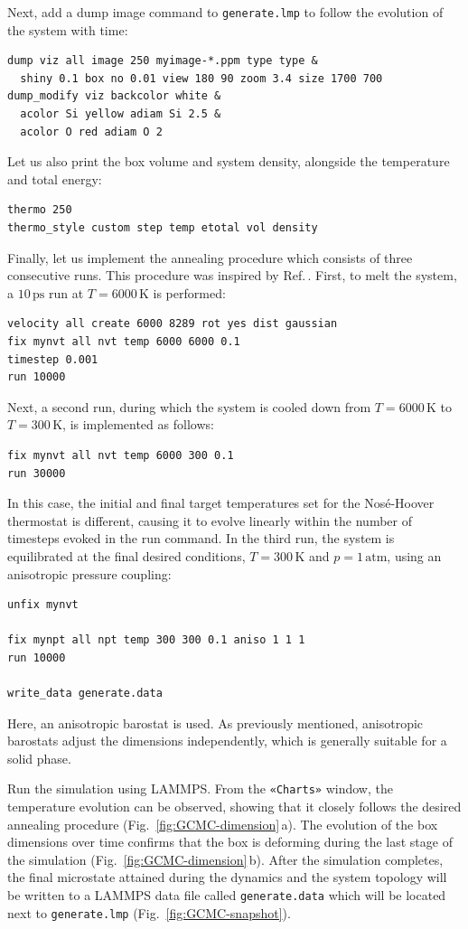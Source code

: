 \documentclass[9pt,tutorial]{livecoms}
\newcommand{\lmpcmd}[1]{\colorbox{listing}{\textcolor{command}{\small{#1}}}} %
\newcommand{\flecmd}[1]{\textcolor{command}{\texttt{#1}}} %
\newcommand{\guicmd}[1]{\textcolor{command}{\texttt{«#1»}}} %
\begin{document}
Next, add a \lmpcmd{dump image} command to \flecmd{generate.lmp} to follow the
evolution of the system with time:
\begin{lstlisting}
dump viz all image 250 myimage-*.ppm type type &
  shiny 0.1 box no 0.01 view 180 90 zoom 3.4 size 1700 700
dump_modify viz backcolor white &
  acolor Si yellow adiam Si 2.5 &
  acolor O red adiam O 2
\end{lstlisting}
Let us also print the box volume and system density, alongside the
temperature and total energy:
\begin{lstlisting}
thermo 250
thermo_style custom step temp etotal vol density
\end{lstlisting}

Finally, let us implement the annealing procedure which
consists of three consecutive runs.  This procedure was inspired
by Ref.\,\cite{della1992molecular}.  First, to melt the system,
a $10\,\text{ps}$ run at $T = 6000\,\text{K}$ is performed:
\begin{lstlisting}
velocity all create 6000 8289 rot yes dist gaussian
fix mynvt all nvt temp 6000 6000 0.1
timestep 0.001
run 10000
\end{lstlisting}
Next, a second run, during which the system is cooled down from $T = 6000\,\text{K}$
to $T = 300\,\text{K}$, is implemented as follows:
\begin{lstlisting}
fix mynvt all nvt temp 6000 300 0.1
run 30000
\end{lstlisting}
In this case, the initial and final target temperatures
set for the Nos\'e-Hoover thermostat is different, causing it to evolve
linearly within the number of timesteps evoked in the \lmpcmd{run} command.
In the third run, the system is equilibrated at the final desired
conditions, $T = 300\,\text{K}$ and $p = 1\,\text{atm}$,
using an anisotropic pressure coupling:
\begin{lstlisting}
unfix mynvt

fix mynpt all npt temp 300 300 0.1 aniso 1 1 1
run 10000

write_data generate.data
\end{lstlisting}
Here, an anisotropic barostat is used.
As previously mentioned, anisotropic
barostats adjust the dimensions independently, which is
generally suitable for a solid phase.

Run the simulation using LAMMPS.  From the \guicmd{Charts} window, the temperature
evolution can be observed, showing that it closely follows the desired annealing procedure (Fig.~\ref{fig:GCMC-dimension}\,a).
The evolution of the box dimensions over time confirms that the box
is deforming during the last stage of the simulation
(Fig.~\ref{fig:GCMC-dimension}\,b).  After the simulation completes, the final
microstate attained during the dynamics and the system topology
will be written to a LAMMPS data file called \flecmd{generate.data}
which will be located next to \flecmd{generate.lmp} (Fig.~\ref{fig:GCMC-snapshot}).
\end{document}
